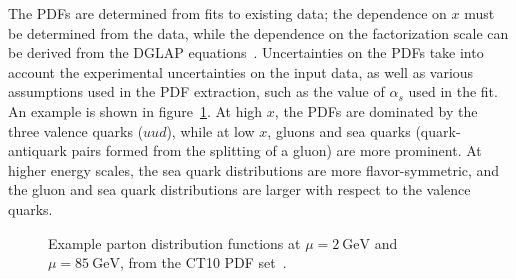 The PDFs are determined from fits to existing data; the dependence on $x$ must be determined from the data, while the dependence on the factorization scale can be derived from the DGLAP equations~\cite{Gribov:1972ri,Dokshitzer:1977sg,Altarelli:1977zs}. Uncertainties on the PDFs take into account the experimental uncertainties on the input data, as well as various assumptions used in the PDF extraction, such as the value of $\alpha_s$ used in the fit. An example is shown in figure~\ref{fig:theory-pdf-example}. At high $x$, the PDFs are dominated by the three valence quarks ($uud$), while at low $x$, gluons and sea quarks (quark-antiquark pairs formed from the splitting of a gluon) are more prominent. At higher energy scales, the sea quark distributions are more flavor-symmetric, and the gluon and sea quark distributions are larger with respect to the valence quarks.


\begin{figure}[htbp]
	\centering
	\hfill
	\hfill
	\hfill
	\caption{Example parton distribution functions at $\mu=\SI{2}{\giga\electronvolt}$ and $\mu=\SI{85}{\giga\electronvolt}$, from the CT10 PDF set~\cite{ct10}.}
	\label{fig:theory-pdf-example}
\end{figure}

